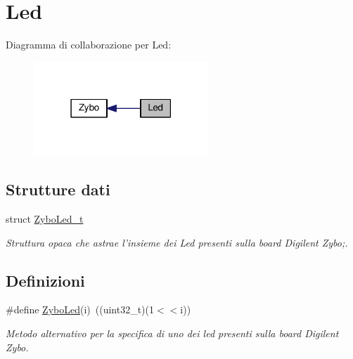\hypertarget{group___led}{\section{Led}
\label{group___led}
}
Diagramma di collaborazione per Led\+:
\nopagebreak
\begin{figure}[H]
\begin{center}
\leavevmode
\includegraphics[width=186pt]{group___led}
\end{center}
\end{figure}
\subsection*{Strutture dati}
\begin{DoxyCompactItemize}
\item 
struct \hyperlink{struct_zybo_led__t}{Zybo\+Led\+\_\+t}
\begin{DoxyCompactList}\small\item\em Struttura opaca che astrae l'insieme dei Led presenti sulla board Digilent Zybo;. \end{DoxyCompactList}\end{DoxyCompactItemize}
\subsection*{Definizioni}
\begin{DoxyCompactItemize}
\item 
\#define \hyperlink{group___led_ga50ab39fed34dc3aaf53cdfd67d8ba25d}{Zybo\+Led}(i)~((uint32\+\_\+t)(1$<$$<$i))
\begin{DoxyCompactList}\small\item\em Metodo alternativo per la specifica di uno dei led presenti sulla board Digilent Zybo. \end{DoxyCompactList}\end{DoxyCompactItemize}
